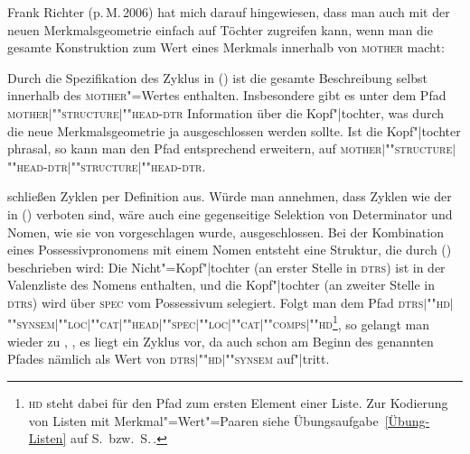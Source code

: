 Frank Richter (p.\,M.\,2006) hat mich darauf hingewiesen, dass man auch mit
der neuen Merkmalsgeometrie einfach auf Töchter zugreifen kann, wenn man die gesamte Konstruktion
zum Wert eines Merkmals innerhalb von \textsc{mother} macht:

\ea
{} 
\z
Durch die Spezifikation des Zyklus in () ist die gesamte Beschreibung selbst innerhalb des
\textsc{mother}"=Wertes enthalten. Insbesondere gibt es unter dem Pfad
\textsc{mother$|$""struc\-ture$|$""head-dtr} Information über die Kopf"|tochter, was durch die neue 
Merkmalsgeometrie ja ausgeschlossen werden sollte. Ist die Kopf"|tochter phrasal, so kann man den Pfad
entsprechend erweitern, \zb auf  \textsc{mother$|$""struc\-ture$|$""head-dtr$|$""struc\-ture$|$""head-dtr}.

\citet[]{ps} schließen Zyklen per Definition aus. Würde man annehmen, dass
Zyklen wie der in () verboten sind, wäre auch eine gegenseitige Selektion von Determinator und Nomen, wie sie von
\citet[Abschnitt~1.8]{ps2} vorgeschlagen wurde, %
ausgeschlossen. Bei der Kombination eines Possessivpronomens mit einem Nomen entsteht eine Struktur, die durch ()
beschrieben wird:
\ea
{}
\z
Die Nicht"=Kopf"|tochter (an erster Stelle in \textsc{dtrs}) ist in der Valenzliste des Nomens
enthalten, und die Kopf"|tochter (an zweiter Stelle in \textsc{dtrs}) wird
über \textsc{spec} vom Possessivum selegiert. Folgt man dem Pfad
\textsc{dtrs$|$""hd$|$""synsem$|$""loc$|$""cat$|$""head$|$""spec$|$""loc$|$""cat$|$""comps$|$""hd}\footnote{
  \textsc{hd} steht dabei für den Pfad zum ersten Element einer Liste. Zur Kodierung von Listen mit
  Merkmal"=Wert"=Paaren siehe Übungsaufgabe~\ref{Übung-Listen} auf S.\,\pageref{Übung-Listen} bzw.\ S.\,\pageref{Seite-Lösungen-Listen}.%
}, so gelangt man wieder zu , \dash, es liegt ein Zyklus vor, da  auch schon am
Beginn des genannten Pfades nämlich als Wert von \textsc{dtrs$|$""hd$|$""synsem} auf"|tritt.


